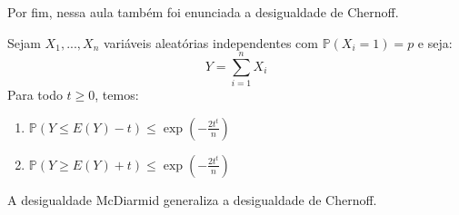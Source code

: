 Por fim, nessa aula também foi enunciada a desigualdade de Chernoff.
\begin{lema}
 Sejam $X_1,...,X_n$ variáveis aleatórias independentes com $\mathbb{P}(X_i = 1) = p$ e seja:
$$Y = \sum_{i=1}^n X_i$$ 
Para todo $t\geq 0$, temos:
\begin{enumerate}
    \centering
    \item $\mathbb{P}(Y \leq E(Y)-t) \leq \exp(-\frac{2t^t}{n})$
    \item $\mathbb{P}(Y \geq E(Y)+t) \leq \exp(-\frac{2t^t}{n})$
\end{enumerate}
\end{lema}

A desigualdade McDiarmid generaliza a desigualdade de Chernoff.